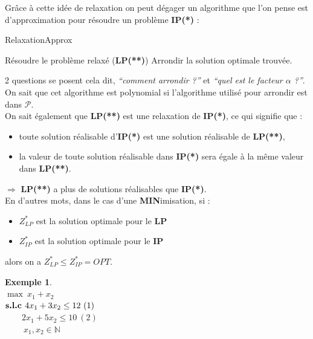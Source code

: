 \documentclass{article}
\newcommand{\N}{\mathbb{N}}
\newtheorem{exemple}{Exemple}[section]
\begin{document}
\begin{sffamily}
Grâce à cette idée de relaxation on peut dégager un algorithme que l'on pense est d'approximation pour résoudre un problème
\textbf{IP(*)} :
\begin{algorithm}[h!]
\caption{RelaxationApprox}
\begin{algorithmic}[1]
\STATE Résoudre le problème relaxé (\textbf{LP(**)})
\STATE Arrondir la solution optimale trouvée.
\end{algorithmic}
\end{algorithm}

2 questions se posent cela dit, \textit{``comment arrondir ?''} et \textit{``quel est le facteur $\alpha$ ?''}.\\
On sait que cet algorithme est polynomial si l'algorithme utilisé pour arrondir est dans $\mathcal{P}$. \\
On sait également que \textbf{LP(**)} est une relaxation de \textbf{IP(*)}, ce qui signifie que :
\begin{itemize}
\item toute solution réalisable d'\textbf{IP(*)} est une solution réalisable de \textbf{LP(**)},
\item la valeur de toute solution réalisable dans \textbf{IP(*)} sera égale à la même valeur dans \textbf{LP(**)}.
\end{itemize}
$\Rightarrow$ \textbf{LP(**)} a plus de solutions réalisables que \textbf{IP(*)}. \\
En d'autres mots, dans le cas d'une \textbf{MIN}imisation, si :
\begin{itemize}
\item $Z^*_{LP}$ est la solution optimale pour le \textbf{LP}
\item $Z^*_{IP}$ est la solution optimale pour le \textbf{IP}
\end{itemize}
alors on a $\boxed{Z^*_{LP} \leq Z^*_{IP} = OPT}$.

\begin{exemple}$ $\\
$\max\ x_1+x_2$ \\
\indent $\text{\textbf{s.l.c }} 4x_1 + 3x_2 \leq 12\ (1)$ \\
\indent	$\qquad 2x_1 + 5x_2 \leq 10\ (2)$ \\
\indent $\qquad\ x_1, x_2 \in \N$


\end{exemple}
\end{sffamily}
\end{document}
